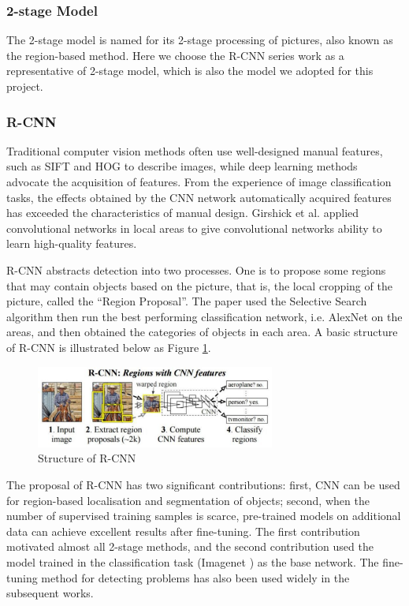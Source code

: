\subsubsection{2-stage Model}

The 2-stage model is named for its 2-stage processing of pictures, also known as the region-based method. Here we choose the R-CNN series work as a representative of 2-stage model, which is also the model we adopted for this project.

\subsubsection{R-CNN}
Traditional computer vision methods often use well-designed manual features, such as SIFT and HOG to describe images, while deep learning methods advocate the acquisition of features. From the experience of image classification tasks, the effects obtained by the CNN network automatically acquired features has exceeded the characteristics of manual design. Girshick et al. \cite{rcnn} applied convolutional networks in local areas to give convolutional networks ability to learn high-quality features.

R-CNN abstracts detection into two processes. One is to propose some regions that may contain objects based on the picture, that is, the local cropping of the picture, called the ``Region Proposal''. The paper \cite{rcnn} used the Selective Search algorithm then run the best performing classification network, i.e. AlexNet on the areas, and then obtained the categories of objects in each area. A basic structure of R-CNN is illustrated below as Figure \ref{fig:rcnn}.

\begin{figure}[h!]
\centering
\includegraphics[width=0.7\textwidth]{rcnn.pdf}
\caption{Structure of R-CNN \cite{rcnn}}
\label{fig:rcnn}
\end{figure}

The proposal of R-CNN has two significant contributions: first, CNN can be used for region-based localisation and segmentation of objects; second, when the number of supervised training samples is scarce, pre-trained models on additional data can achieve excellent results after fine-tuning. The first contribution motivated almost all 2-stage methods, and the second contribution used the model trained in the classification task (Imagenet \cite{imagenet}) as the base network. The fine-tuning method for detecting problems has also been used widely in the subsequent works.

